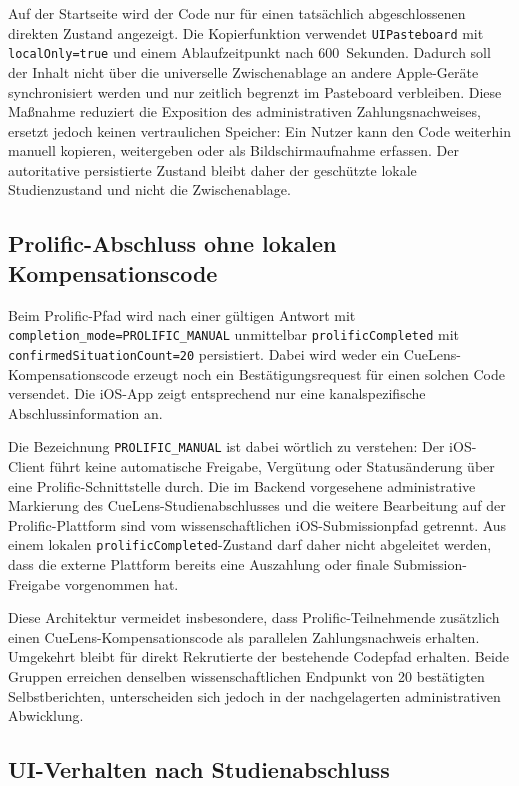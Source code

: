 \begin{neu}
Auf der Startseite wird der Code nur für einen tatsächlich abgeschlossenen direkten Zustand angezeigt. Die Kopierfunktion verwendet \texttt{UIPasteboard} mit \texttt{localOnly=true} und einem Ablaufzeitpunkt nach 600~Sekunden. Dadurch soll der Inhalt nicht über die universelle Zwischenablage an andere Apple-Geräte synchronisiert werden und nur zeitlich begrenzt im Pasteboard verbleiben. Diese Maßnahme reduziert die Exposition des administrativen Zahlungsnachweises, ersetzt jedoch keinen vertraulichen Speicher: Ein Nutzer kann den Code weiterhin manuell kopieren, weitergeben oder als Bildschirmaufnahme erfassen. Der autoritative persistierte Zustand bleibt daher der geschützte lokale Studienzustand und nicht die Zwischenablage.

\subsection{Prolific-Abschluss ohne lokalen Kompensationscode}

Beim Prolific-Pfad wird nach einer gültigen Antwort mit \texttt{completion\_mode=PROLIFIC\_MANUAL} unmittelbar \texttt{prolificCompleted} mit \texttt{confirmedSituationCount=20} persistiert. Dabei wird weder ein CueLens-Kompensationscode erzeugt noch ein Bestätigungsrequest für einen solchen Code versendet. Die iOS-App zeigt entsprechend nur eine kanalspezifische Abschlussinformation an.

Die Bezeichnung \texttt{PROLIFIC\_MANUAL} ist dabei wörtlich zu verstehen: Der iOS-Client führt keine automatische Freigabe, Vergütung oder Statusänderung über eine Prolific-Schnittstelle durch. Die im Backend vorgesehene administrative Markierung des CueLens-Studienabschlusses und die weitere Bearbeitung auf der Prolific-Plattform sind vom wissenschaftlichen iOS-Submissionpfad getrennt. Aus einem lokalen \texttt{prolificCompleted}-Zustand darf daher nicht abgeleitet werden, dass die externe Plattform bereits eine Auszahlung oder finale Submission-Freigabe vorgenommen hat.

Diese Architektur vermeidet insbesondere, dass Prolific-Teilnehmende zusätzlich einen CueLens-Kompensationscode als parallelen Zahlungsnachweis erhalten. Umgekehrt bleibt für direkt Rekrutierte der bestehende Codepfad erhalten. Beide Gruppen erreichen denselben wissenschaftlichen Endpunkt von 20 bestätigten Selbstberichten, unterscheiden sich jedoch in der nachgelagerten administrativen Abwicklung.

\subsection{UI-Verhalten nach Studienabschluss}


\end{neu}
